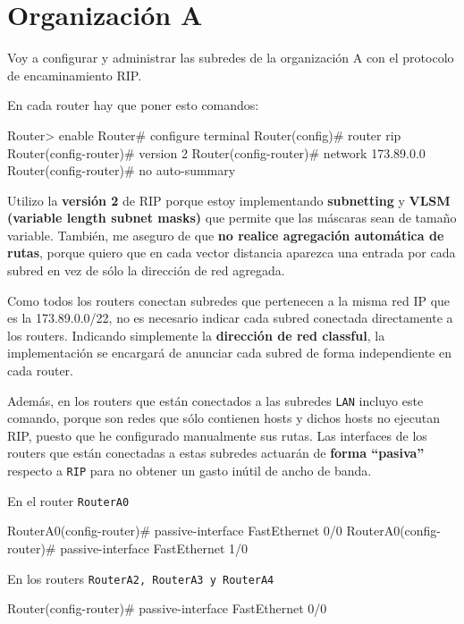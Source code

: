 
\section{Organización A}

\par Voy a configurar y administrar las subredes de la organización A con el protocolo de encaminamiento RIP.
\par En cada router hay que poner esto comandos:
\begin{listing}[style=consola]
Router> enable
Router# configure terminal
Router(config)# router rip
Router(config-router)# version 2
Router(config-router)# network 173.89.0.0
Router(config-router)# no auto-summary
\end{listing}
\par Utilizo la \textbf{versión 2} de RIP porque estoy implementando \textbf{subnetting} y \textbf{VLSM (variable length subnet masks)} que permite que las máscaras sean de tamaño variable. También, me aseguro de que \textbf{no realice agregación automática de rutas}, porque quiero que en cada vector distancia aparezca una entrada por cada subred en vez de sólo la dirección de red agregada.
\par Como todos los routers conectan subredes que pertenecen a la misma red IP que es la 173.89.0.0/22, no es necesario indicar cada subred conectada directamente a los routers. Indicando simplemente la \textbf{dirección de red classful}, la implementación se encargará de anunciar cada subred de forma independiente en cada router.
\par Además, en los routers que están conectados a las subredes \texttt{LAN} incluyo este comando, porque son redes que sólo contienen hosts y dichos hosts no ejecutan RIP, puesto que he configurado manualmente sus rutas. Las interfaces de los routers que están conectadas a estas subredes actuarán de \textbf{forma ``pasiva''} respecto a \texttt{RIP} para no obtener un gasto inútil de ancho de banda.
\par En el router \texttt{RouterA0} 
\begin{listing}[style=consola]
RouterA0(config-router)# passive-interface FastEthernet 0/0
RouterA0(config-router)# passive-interface FastEthernet 1/0
\end{listing}
\par En los routers \texttt{RouterA2, RouterA3 y RouterA4}
\begin{listing}[style=consola]
Router(config-router)# passive-interface FastEthernet 0/0
\end{listing}






\newpage